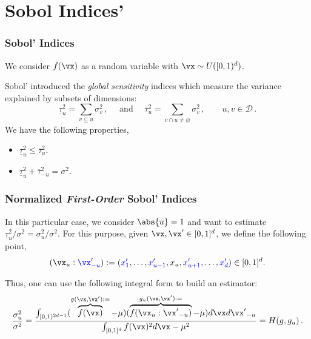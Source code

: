 \documentclass[11pt,compress]{beamer} %
\begin{document}
\section{Sobol Indices'}

\begin{frame}
\frametitle{Sobol' Indices}
We consider $f(\vx)$ as a random variable with $\vx\sim U([0,1)^d)$.

Sobol' introduced the \emph{global sensitivity} indices which measure the variance explained by subsets of dimensions:
\begin{equation*}
\underline{\tau}_u^2 = \sum_{v \subseteq u} \sigma_v^2\, , \quad \text{ and } \quad \overline{\tau}_u^2 = \sum_{v \cap u\neq\varnothing} \sigma_v^2\, , \qquad u,v\in\mathcal{D}\, .
\end{equation*}
We have the following properties,
\begin{itemize}
\item $\underline{\tau}_u^2\leq \overline{\tau}_u^2$.
\item $\underline{\tau}_u^2 + \overline{\tau}_{-u}^2 =\sigma^2$.
\end{itemize}
\end{frame}

\begin{frame}
\frametitle{Normalized \emph{First-Order} Sobol' Indices}
In this particular case, we consider $\abs{u}=1$ and want to estimate $\underline{\tau}_u^2/\sigma^2=\sigma_u^2/\sigma^2$. For this purpose, given $\vx,\vx'\in [0,1]^d$, we define the following point,
\begin{gather*}
(\vx_u:{\color{blue}\vx'_{-u}}) := ({\color{blue}x'_1},\dots,{\color{blue}x'_{u-1}},x_u,{\color{blue}x'_{u+1}},\dots,{\color{blue}x'_d})\in [0,1]^d.
\end{gather*}

Thus, one can use the following integral form to build an estimator:
\begin{equation*}
\frac{\sigma_u^2}{\sigma^2}=\frac{\int_{[0,1)^{2d-1}}(\overbrace{f(\vx)}^{g(\vx,\vx'):=} - \mu) (\overbrace{f(\vx_u:{\vx'}_{-u})}^{g_u(\vx,\vx'):=}-\mu) d\vx d{\vx'}_{-u}}{\int_{[0,1]^d} f(\vx)^2 d{\vx}-\mu^2}=H(g,g_u)\, .
\end{equation*}
\end{frame}
\end{document}
